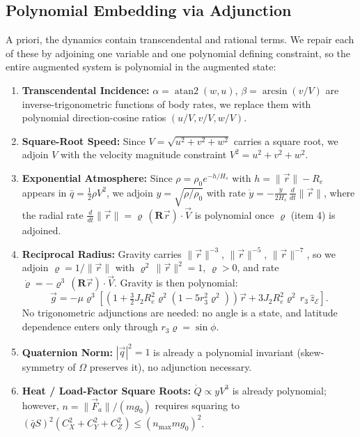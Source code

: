 \subsection{Polynomial Embedding via Adjunction}
\label{sub:apx_dyn_embedding}

A priori, the dynamics contain transcendental and rational terms. We repair
each of these by adjoining one variable and one polynomial defining constraint,
so the entire augmented system is polynomial in the augmented state:

\begin{enumerate}
  \item \textbf{Transcendental Incidence:} $\alpha = \operatorname{atan2}(w, u)$,
        $\beta = \arcsin(v/V)$ are inverse-trigonometric functions of body
        rates, we replace them with polynomial direction-cosine ratios
        $(u/V, v/V, w/V)$.
  \item \textbf{Square-Root Speed:} Since $V = \sqrt{u^2+v^2+w^2}$ carries a
        square root, we adjoin $V$ with the velocity magnitude constraint
        $V^2 = u^2+v^2+w^2$.
  \item \textbf{Exponential Atmosphere:} Since $\rho = \rho_0 e^{-h/H_s}$ with
        $h = \|\vec r\| - R_e$ appears in $\bar q = \tfrac12\rho V^2$, we adjoin
        $y = \sqrt{\rho/\rho_0}$ with rate
        $\dot y = -\frac{y}{2H_s}\,\tfrac{d}{dt}\|\vec r\|$, where the radial
        rate $\tfrac{d}{dt}\|\vec r\| = \varrho\,(\mathbf R\vec r)\cdot\vec V$ is
        polynomial once $\varrho$ (item 4) is adjoined.
  \item \textbf{Reciprocal Radius:} Gravity carries $\|\vec r\|^{-3}$,
        $\|\vec r\|^{-5}$, $\|\vec r\|^{-7}$, so we adjoin
        $\varrho = 1/\|\vec r\|$ with $\varrho^2\,\|\vec r\|^2 = 1$,
        $\varrho > 0$, and rate
        $\dot\varrho = -\varrho^3\,(\mathbf R\vec r)\cdot\vec V$. Gravity is then
        polynomial:
        \begin{equation}
        \label{eq:gravity_poly}
        \vec g = -\mu\varrho^3\left[\left(1
        + \tfrac32 J_2 R_e^2\varrho^2\left(1 - 5 r_3^2\varrho^2\right)\right)\vec r
        + 3J_2R_e^2\varrho^2\,r_3\,\hat z_{\mathcal E}\right].
        \end{equation}
        No trigonometric adjunctions are needed: no angle is a state, and
        latitude dependence enters only through $r_3\varrho = \sin\phi$.
  \item \textbf{Quaternion Norm:} $|\vec q|^2 = 1$ is already a polynomial
        invariant (skew-symmetry of $\Omega$ preserves it), no adjunction
        necessary.
  \item \textbf{Heat / Load-Factor Square Roots:} $\dot Q \propto y V^3$ is
        already polynomial; however, $n = \|\vec F_a\|/(mg_0)$ requires squaring
        to $(\bar q S)^2(C_X^2+C_Y^2+C_Z^2) \le (n_\text{max} m g_0)^2$.
\end{enumerate}

